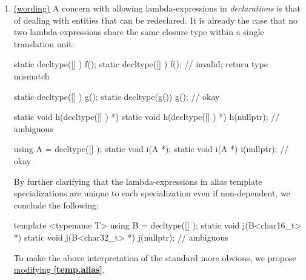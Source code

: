 \documentclass{wg21}
\newcommand{\cc}[1]{\texttt{#1}}
\begin{document}
\begin{enumerate}
\begin{cpp}
inline int f() {
  return counter<decltype([] {})>();
}

// translation unit 1:
#include "a.h"
int foo() { return f(); }

// translation unit 2:
#include "a.h"
int bar() { return f(); }
\end{cpp}

    Given such code, a question might be whether \cc foo and \cc bar modify
    the same \cc cnt variable, since \cc f is defined in a header and it calls
    \cc counter with a closure type that is supposed to be unique. However,
    since \cc f is \cc inline, the resulting program is as-if there was a
    single definition of it, and so both functions end up modifying the same
    \cc cnt variable. This turns out not to be a problem for implementations,
    because they must already handle such cases where there is an ODR context
    to attach the closure type to. Thus, no wording change is required.


  \item \label{discussion.redeclarations}
    \hyperref[wording.redeclarations]{(wording)}
    A concern with allowing lambda-expressions in \textit{declarations} is
    that of dealing with entities that can be redeclared. It is already the
    case that no two lambda-expressions share the same closure type within a
    single translation unit:

\begin{cpp}
static decltype([] { }) f();
static decltype([] { }) f(); // invalid; return type mismatch

static decltype([] { }) g();
static decltype(g()) g(); // okay

static void h(decltype([] { }) *) { }
static void h(decltype([] { }) *) { }
h(nullptr); // ambiguous

using A = decltype([] { });
static void i(A *);
static void i(A *) { }
i(nullptr); // okay
\end{cpp}

   By further clarifying that the lambda-expressions in alias template
   specializations are unique to each specialization even if non-dependent,
   we conclude the following:

\begin{cpp}
template <typename T>
using B = decltype([] { });
static void j(B<char16_t> *) { }
static void j(B<char32_t> *) { }
j(nullptr); // ambiguous
\end{cpp}

    To make the above interpretation of the standard more obvious, we propose
    \hyperref[wording.redeclarations]{modifying \textbf{[temp.alias]}}.


\end{enumerate}
\end{document}
